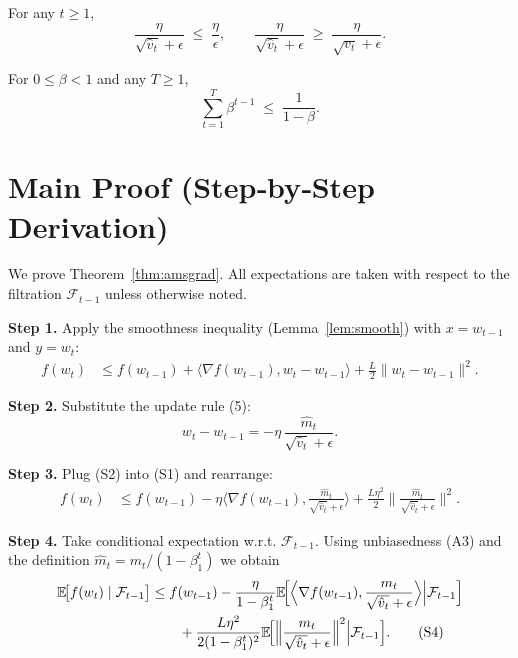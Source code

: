 \documentclass[11pt]{article}
\newcommand{\E}{\mathbb{E}}
\begin{document}
\begin{lemma}\label{lem:stepsize}
For any $t\ge1$,
\[
\frac{\eta}{\sqrt{\hat v_{t}}+\epsilon}\;\le\;
\frac{\eta}{\epsilon},\qquad
\frac{\eta}{\sqrt{\hat v_{t}}+\epsilon}\;\ge\;
\frac{\eta}{\sqrt{v_{t}}+\epsilon}. \tag{L2}
\]
\end{lemma}

\begin{lemma}\label{lem:beta}
For $0\le\beta<1$ and any $T\ge1$,
\[
\sum_{t=1}^{T}\beta^{t-1}\;\le\;\frac{1}{1-\beta}. \tag{L3}
\]
\end{lemma}

\section*{Main Proof (Step‑by‑Step Derivation)}
We prove Theorem~\ref{thm:amsgrad}.  All expectations are taken with respect to the
filtration $\mathcal{F}_{t-1}$ unless otherwise noted.

\textbf{Step 1.} Apply the smoothness inequality (Lemma~\ref{lem:smooth})
with $x=w_{t-1}$ and $y=w_{t}$:
\begin{align}
f(w_{t}) &\le f(w_{t-1})
+ \langle\nabla f(w_{t-1}), w_{t}-w_{t-1}\rangle
+ \frac{L}{2}\|w_{t}-w_{t-1}\|^{2}. \tag{S1}
\end{align}

\textbf{Step 2.} Substitute the update rule (5):
\[
w_{t}-w_{t-1}= -\eta\,
\frac{\hat m_{t}}{\sqrt{\hat v_{t}}+\epsilon}. \tag{S2}
\]

\textbf{Step 3.} Plug (S2) into (S1) and rearrange:
\begin{align}
f(w_{t}) &\le f(w_{t-1})
- \eta\Big\langle\nabla f(w_{t-1}),\frac{\hat m_{t}}{\sqrt{\hat v_{t}}+\epsilon}\Big\rangle
+ \frac{L\eta^{2}}{2}\Big\|\frac{\hat m_{t}}{\sqrt{\hat v_{t}}+\epsilon}\Big\|^{2}. \tag{S3}
\end{align}

\textbf{Step 4.} Take conditional expectation w.r.t. $\mathcal{F}_{t-1}$.
Using unbiasedness (A3) and the definition $\hat m_{t}=m_{t}/(1-\beta_{1}^{t})$ we obtain
\begin{align}
\E\!\bigl[f(w_{t})\mid\mathcal{F}_{t-1}\bigr]
&\le f(w_{t-1})
- \frac{\eta}{1-\beta_{1}^{t}}
\E\!\Bigl[\Big\langle\nabla f(w_{t-1}),\frac{m_{t}}{\sqrt{\hat v_{t}}+\epsilon}\Big\rangle\Big|\mathcal{F}_{t-1}\Bigr] \nonumber\\
&\qquad
+ \frac{L\eta^{2}}{2(1-\beta_{1}^{t})^{2}}
\E\!\Bigl[\Big\|\frac{m_{t}}{\sqrt{\hat v_{t}}+\epsilon}\Big\|^{2}\Big|\mathcal{F}_{t-1}\Bigr]. \tag{S4}
\end{align}
\end{document}
